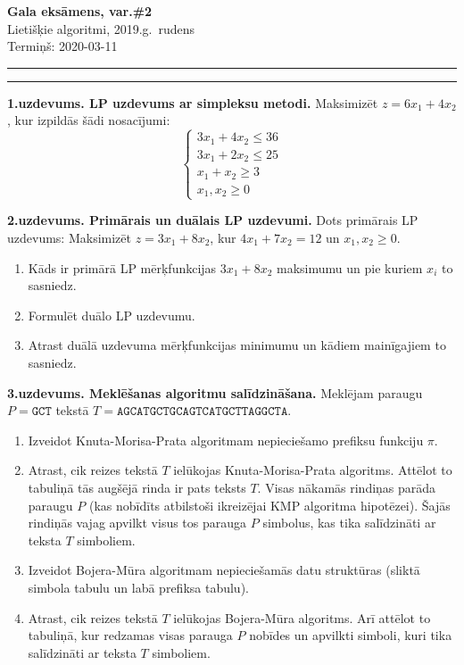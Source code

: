 \documentclass[a4paper,12pt]{article}
\begin{document}
\thispagestyle{empty}

\begin{center}
{\bf\Huge Gala eksāmens, var.\#2} \\[5pt]
Lietišķie algoritmi, 2019.g.\ rudens\\
Termiņš: 2020-03-11
\end{center}

\hrule
\vspace{2pt}
\hrule
\vspace{12pt}



\noindent
{\bf 1.uzdevums. LP uzdevums ar simpleksu metodi.}  
Maksimizēt $z = 6x_1 + 4x_2$, kur izpildās šādi nosacījumi:
$$\left\{ \begin{array}{l}
3x_1 + 4x_2 \leq 36\\
3x_1 + 2x_2 \leq 25\\
x_1 + x_2 \geq 3\\
x_1,x_2 \geq 0
\end{array} \right.$$

\vspace{6pt}
{\bf 2.uzdevums. Primārais un duālais LP uzdevumi.}
Dots primārais LP uzdevums: Maksimizēt $z = 3 x_1 + 8 x_2$, 
kur $4 x_1 + 7x_2  = 12$ un $x_1, x_2 \geq 0$. 
\begin{enumerate}
\item Kāds ir primārā LP mērķfunkcijas $3x_1 + 8x_2$ maksimumu un pie kuriem $x_i$ to sasniedz.
\item Formulēt duālo LP uzdevumu. 
\item Atrast duālā uzdevuma mērķfunkcijas minimumu un kādiem mainīgajiem to sasniedz.
\end{enumerate}



\vspace{6pt}
{\bf 3.uzdevums. Meklēšanas algoritmu salīdzināšana.} Meklējam paraugu $P = \mathtt{GCT}$
tekstā $T = \mathtt{AGCATGCTGCAGTCATGCTTAGGCTA}$. 
\begin{enumerate}
\item Izveidot Knuta-Morisa-Prata algoritmam nepieciešamo prefiksu funkciju $\pi$. 
\item Atrast, cik reizes tekstā $T$ ielūkojas
Knuta-Morisa-Prata algoritms. Attēlot to tabuliņā \textendash{} 
tās augšējā rinda ir pats teksts $T$. 
Visas nākamās rindiņas parāda paraugu $P$ (kas nobīdīts
atbilstoši ikreizējai KMP algoritma hipotēzei). 
Šajās rindiņās vajag apvilkt visus tos parauga $P$ 
simbolus, kas tika salīdzināti ar teksta $T$ simboliem. 
\item Izveidot Bojera-Mūra algoritmam nepieciešamās datu struktūras (sliktā simbola tabulu 
un labā prefiksa tabulu).
\item Atrast, cik reizes tekstā $T$ ielūkojas
Bojera-Mūra algoritms. Arī attēlot to tabuliņā, kur 
redzamas visas parauga $P$ nobīdes un apvilkti simboli, 
kuri tika salīdzināti ar teksta $T$ simboliem. 
\end{enumerate}
\end{document}
